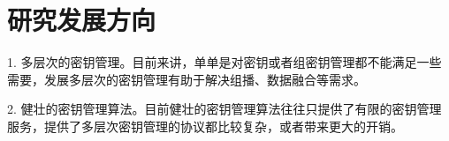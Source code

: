 \documentclass[a4paper,10pt]{article}
\begin{document}
\section{研究发展方向}

1. 多层次的密钥管理。目前来讲，单单是对密钥或者组密钥管理都不能满足一些需要，发展多层次的密钥管理有助于解决组播、数据融合等需求。

2. 健壮的密钥管理算法。目前健壮的密钥管理算法往往只提供了有限的密钥管理服务，提供了多层次密钥管理的协议都比较复杂，或者带来更大的开销。



\end{document}
